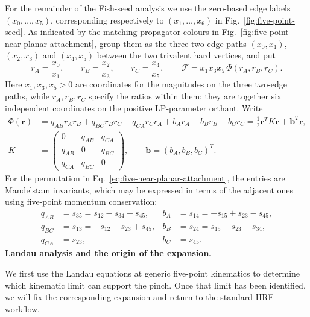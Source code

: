 \documentclass[a4paper,11pt]{article}
\begin{document}
For the remainder of the Fish-seed analysis we use the zero-based edge labels
\((x_0,\ldots,x_5)\), corresponding respectively to
\((x_1,\ldots,x_6)\) in Fig.~\ref{fig:five-point-seed}.  As indicated by the
matching propagator colours in
Fig.~\ref{fig:five-point-near-planar-attachment}, group them as the three
two-edge paths \((x_0,x_1)\),
\((x_2,x_3)\) and \((x_4,x_5)\) between the two trivalent hard vertices, and put
\begin{equation}
 r_A=\frac{x_0}{x_1},\qquad r_B=\frac{x_2}{x_3},\qquad
 r_C=\frac{x_4}{x_5},\qquad
 \mathcal F=x_1x_3x_5\,\Phi(r_A,r_B,r_C).
 \label{eq:five-path-ratios}
\end{equation}
Here \(x_1,x_3,x_5>0\) are coordinates for the magnitudes on the three
two-edge paths, while \(r_A,r_B,r_C\) specify the ratios within them; they
are together six independent coordinates on the positive LP-parameter
orthant.  Write
\begin{align}
 \Phi(\boldsymbol r)&=q_{AB}r_Ar_B+q_{BC}r_Br_C
 +q_{CA}r_Cr_A+b_A r_A+b_B r_B+b_C r_C
 =\frac12\boldsymbol r^T K\boldsymbol r+\boldsymbol b^T\boldsymbol r,
 \nonumber\\
 K&=\begin{pmatrix}
 0&q_{AB}&q_{CA}\\ q_{AB}&0&q_{BC}\\ q_{CA}&q_{BC}&0
 \end{pmatrix},
 \qquad \boldsymbol b=(b_A,b_B,b_C)^T.
 \label{eq:five-ratio-quadratic}
\end{align}
For the permutation in Eq.~\eqref{eq:five-near-planar-attachment},
the entries are Mandelstam invariants, which may be expressed in terms of
the adjacent ones using five-point momentum conservation:
\begin{align}
 q_{AB}&=s_{35}=s_{12}-s_{34}-s_{45},
 &b_A&=s_{14}=-s_{15}+s_{23}-s_{45},\nonumber\\
 q_{BC}&=s_{13}=-s_{12}-s_{23}+s_{45},
 &b_B&=s_{24}=s_{15}-s_{23}-s_{34},\nonumber\\
 q_{CA}&=s_{23},
 &b_C&=s_{45}.
 \label{eq:five-ratio-coefficients}
\end{align}
\medskip
\noindent\textbf{Landau analysis and the origin of the expansion.}\par\smallskip

We first use the Landau equations at generic five-point
kinematics to determine which kinematic limit can support the pinch.  Once
that limit has been identified, we will fix the corresponding expansion
and return to the standard HRF workflow.
\end{document}

